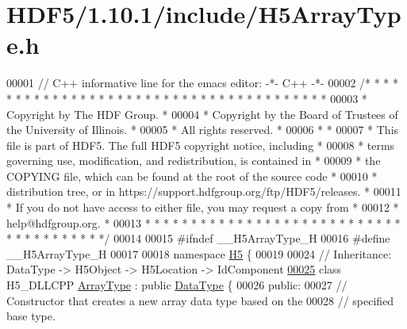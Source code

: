\hypertarget{_h_d_f5_21_810_81_2include_2_h5_array_type_8h_source}{}\section{H\+D\+F5/1.10.1/include/\+H5\+Array\+Type.h}
\label{_h_d_f5_21_810_81_2include_2_h5_array_type_8h_source}

\begin{DoxyCode}
00001 \textcolor{comment}{// C++ informative line for the emacs editor: -*- C++ -*-}
00002 \textcolor{comment}{/* * * * * * * * * * * * * * * * * * * * * * * * * * * * * * * * * * * * * * *}
00003 \textcolor{comment}{ * Copyright by The HDF Group.                                               *}
00004 \textcolor{comment}{ * Copyright by the Board of Trustees of the University of Illinois.         *}
00005 \textcolor{comment}{ * All rights reserved.                                                      *}
00006 \textcolor{comment}{ *                                                                           *}
00007 \textcolor{comment}{ * This file is part of HDF5.  The full HDF5 copyright notice, including     *}
00008 \textcolor{comment}{ * terms governing use, modification, and redistribution, is contained in    *}
00009 \textcolor{comment}{ * the COPYING file, which can be found at the root of the source code       *}
00010 \textcolor{comment}{ * distribution tree, or in https://support.hdfgroup.org/ftp/HDF5/releases.  *}
00011 \textcolor{comment}{ * If you do not have access to either file, you may request a copy from     *}
00012 \textcolor{comment}{ * help@hdfgroup.org.                                                        *}
00013 \textcolor{comment}{ * * * * * * * * * * * * * * * * * * * * * * * * * * * * * * * * * * * * * * */}
00014 
00015 \textcolor{preprocessor}{#ifndef \_\_H5ArrayType\_H}
00016 \textcolor{preprocessor}{#define \_\_H5ArrayType\_H}
00017 
00018 \textcolor{keyword}{namespace }\hyperlink{namespace_h5}{H5} \{
00019 
00024 \textcolor{comment}{//  Inheritance: DataType -> H5Object -> H5Location -> IdComponent}
\hyperlink{class_h5_1_1_array_type}{00025} \textcolor{keyword}{class }H5\_DLLCPP \hyperlink{class_h5_1_1_array_type}{ArrayType} : \textcolor{keyword}{public} \hyperlink{class_h5_1_1_data_type}{DataType} \{
00026    \textcolor{keyword}{public}:
00027         \textcolor{comment}{// Constructor that creates a new array data type based on the}
00028         \textcolor{comment}{// specified base type.}

\end{DoxyCode}
